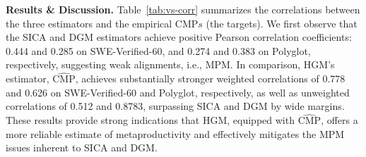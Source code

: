 \documentclass{article}
\begin{document}
  
\begin{table}[t!]
  \centering
  \label{tab:vs-corr}
  \renewcommand\arraystretch{1.2} 
\end{table}

\textbf{Results \& Discussion.} Table~\ref{tab:vs-corr} summarizes the correlations between the three estimators and the empirical $\mathrm{CMP}s$ (the targets). We first observe that the SICA and DGM estimators achieve positive Pearson correlation coefficients: 0.444 and 0.285 on SWE-Verified-60, and 0.274 and 0.383 on Polyglot, respectively, suggesting weak alignments, i.e., MPM. 
In comparison, HGM's estimator, $\widehat{\mathrm{CMP}}$, achieves substantially stronger weighted correlations of 0.778 and 0.626 on SWE-Verified-60 and Polyglot, respectively, as well as unweighted correlations of 0.512 and 0.8783, surpassing SICA and DGM by wide margins.
These results provide strong indications that HGM, equipped with $\widehat{\mathrm{CMP}}$, offers a more reliable estimate of metaproductivity and effectively mitigates the MPM issues inherent to SICA and DGM. 
\end{document}
